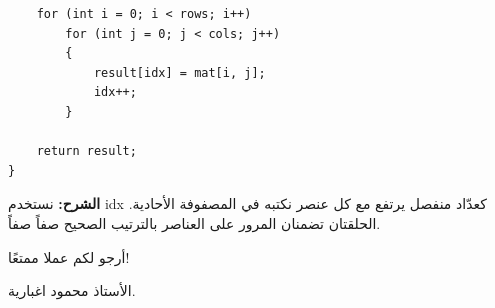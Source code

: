 \documentclass[14pt]{extarticle}
\begin{document}
\begin{enumerate}[itemsep=2em]
\begin{boxSolution}
\begin{boxCode}
\begin{english}
\begin{verbatim}
    for (int i = 0; i < rows; i++)
        for (int j = 0; j < cols; j++)
        {
            result[idx] = mat[i, j];
            idx++;
        }

    return result;
}
\end{verbatim}
\end{english}
\end{boxCode}
\textbf{الشرح:} نستخدم \textenglish{idx} كعدّاد منفصل يرتفع مع كل عنصر نكتبه في المصفوفة الأحادية. الحلقتان تضمنان المرور على العناصر بالترتيب الصحيح صفاً صفاً.
\end{boxSolution}
\fi

\end{enumerate}


\vspace{1cm}
\begin{flushleft}
أرجو لكم عملا ممتعًا!

الأستاذ محمود اغبارية.
\end{flushleft}
\end{document}
